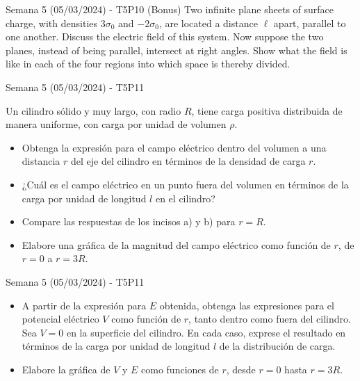 \begin{frame}{Semana 5 (05/03/2024) - T5P10 (Bonus)}
    Two infinite plane sheets of surface charge, with densities $3\sigma_0$ and $-2\sigma_0$, are located a distance $\ell$ apart, parallel to one another. Discuss the electric field of this system. Now suppose the two planes, instead of being parallel, intersect at right angles. Show what the field is like in each of the four regions into which space is thereby divided.
\end{frame}

\begin{frame}{Semana 5 (05/03/2024) - T5P11}
    
Un cilindro sólido y muy largo, con radio $R$, tiene carga positiva distribuida de manera uniforme, con carga por unidad de volumen $\rho$.

\begin{itemize}
    \item[a)] Obtenga la expresión para el campo eléctrico dentro del volumen a una distancia $r$ del eje del cilindro en términos de la densidad de carga $r$.
    \item[b)] ¿Cuál es el campo eléctrico en un punto fuera del volumen en términos de la carga por unidad de longitud $l$ en el cilindro?
    \item[c)] Compare las respuestas de los incisos a) y  b) para $r = R$. 
    \item[d)] Elabore una gráfica de la magnitud del campo eléctrico como función de $r$, de $r = 0$ a $r = 3R$.
\end{itemize}

\end{frame}

\begin{frame}{Semana 5 (05/03/2024) - T5P11}
    \begin{itemize}
    
        \item[e)] A partir de la expresión para $E$ obtenida, obtenga las expresiones para el potencial eléctrico $V$ como
función de $r$, tanto dentro como fuera del cilindro. Sea $V = 0$ en la superficie del cilindro. En cada caso, exprese el resultado en términos de la
carga por unidad de longitud $l$ de la distribución de carga.
\item[f)] Elabore 
la gráfica de $V$ y $E$ como funciones de $r$, desde $r = 0$ hasta $r = 3R$.
    \end{itemize}
\end{frame}

